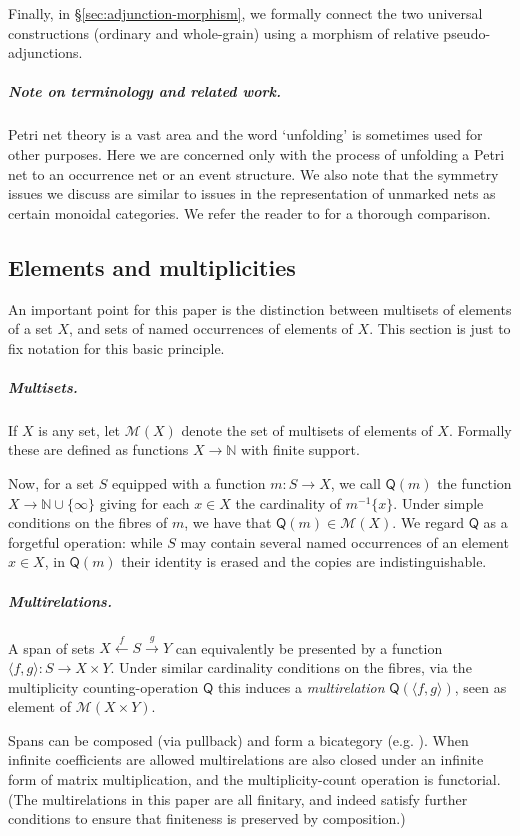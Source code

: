 \documentclass[11pt,a4paper]{article}
\theoremstyle{plain}
\theoremstyle{definition}
\theoremstyle{remark}
\newcommand{\calM}{\mathcal{M}}
\newcommand{\Q}{\mathsf{Q}}
\begin{document}
Finally, in \S\ref{sec:adjunction-morphism}, we formally  connect the two universal constructions (ordinary and whole-grain) using a morphism of relative pseudo-adjunctions.

\subparagraph*{Note on terminology and related work.} Petri net theory is a vast area and the word `unfolding' is sometimes used for other purposes. Here we are concerned only with the process of unfolding a Petri net to an occurrence net or an event structure. We also note that the symmetry issues we discuss are similar to issues in the representation of unmarked nets as certain monoidal categories. We refer the reader to \cite{WGPN} for a thorough comparison.

\subsection{Elements and multiplicities}
\label{subsec:elem-mult}

An important point for this paper is the distinction between multisets of
elements of a set $X$, and sets of named occurrences of elements of $X$. This
section is just to fix notation for this basic principle.



\subparagraph{Multisets.} If $X$ is any set, let $\calM(X)$ denote the set of multisets of elements of $X$. Formally these are defined as functions $X \to \mathbb N$ with finite support. 

Now, for a set $S$ equipped with a function $m : S \to X$, we call
$\Q(m)$ the function $X \to \mathbb{N} \cup \{\infty \}$ giving for each $x \in X$ the cardinality of $m^{-1}\{ x\}$. Under simple conditions on the fibres of $m$, we have that $\Q(m) \in \calM(X)$. We regard $\Q$ as a forgetful operation: while
$S$ may contain several named occurrences of an element $x \in X$, in $\Q(m)$
their identity is erased and the copies are indistinguishable.

\subparagraph{Multirelations.}


A span of sets $X \xleftarrow f S \xrightarrow g Y$
can equivalently be presented by a function $\langle f, g \rangle : S \to X \times Y$. Under similar cardinality conditions on the fibres, via the multiplicity counting-operation $\Q$ this induces a \emph{multirelation} $\Q(\langle f, g \rangle )$, seen as element of $\calM(X \times Y)$.

Spans can be composed (via pullback) and form a bicategory (e.g. \cite{BSR}). When infinite coefficients are allowed multirelations are also closed under an infinite form of matrix multiplication, and the multiplicity-count operation is functorial.  (The multirelations in this paper are all finitary, and indeed satisfy further conditions to ensure that finiteness is preserved by composition.)
\end{document}
